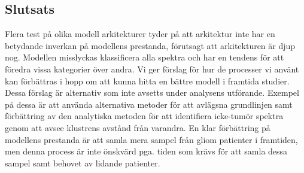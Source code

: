 \subsection*{Slutsats}

Flera test på olika modell arkitekturer tyder på att arkitektur inte har en betydande inverkan på modellens prestanda, förutsagt att arkitekturen är djup nog. Modellen misslyckas klassificera alla spektra och har en tendens för att föredra vissa kategorier över andra. Vi ger förslag för hur de processer vi använt kan förbättras i hopp om att kunna hitta en bättre modell i framtida studier. Dessa förslag är alternativ som inte avsetts under analysens utförande. Exempel på dessa är att använda alternativa metoder för att avlägsna grundlinjen samt förbättring av den analytiska metoden för att identifiera icke-tumör spektra genom att avsee klustrens avstånd från varandra. En klar förbättring på modellens prestanda är att samla mera sampel från gliom patienter i framtiden, men denna process är inte önskvärd pga. tiden som krävs för att samla dessa sampel samt behovet av lidande patienter.